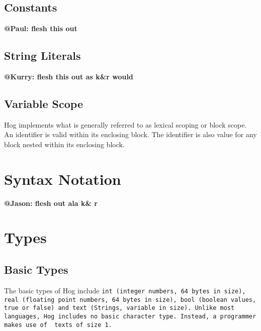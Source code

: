 \documentclass{book}
\begin{document}

\section{Constants} %
\label{sec:constants}

\textbf{@Paul: flesh this out}


\section{String Literals} %
\label{sec:string_literals}

\textbf{@Kurry: flesh this out as k\&r would}


\section{Variable Scope} %
\label{sec:variable_scope}

Hog implements what is generally referred to as lexical scoping or block scope. An
identifier is valid within its enclosing block. The identifier is also value for
any block nested within its enclosing block.



\chapter{Syntax Notation} %
\label{cha:syntax_notation}

\textbf{@Jason: flesh out ala k\& r}


\chapter{Types} %
\label{cha:types}

\section{Basic Types} %
\label{sec:basic_types}

The basic types of Hog include \tt int \rm (integer numbers, 64 bytes in size), \tt
real \rm (floating point numbers, 64 bytes in size), \tt bool \rm(boolean values,
true or false) and \tt text \rm (Strings, variable in size). Unlike most languages,
Hog includes no basic character type. Instead, a programmer makes use of \tt
text\rm s of size 1.
\end{document}
